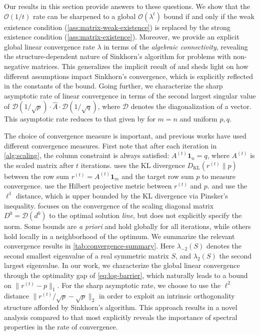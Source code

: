 Our results in this section provide answers to these questions. We show that the $\mathcal O(1/t)$ rate can be sharpened to a global $\mathcal O(\lambda^t)$ bound if and only if the weak existence condition (\cref{ass:matrix-weak-existence}) is replaced by the strong existence condition (\cref{ass:matrix-existence}). Moreover, we provide an explicit global linear convergence rate $\lambda$ in terms of the \emph{algebraic connectivity}, revealing the structure-dependent nature of Sinkhorn's algorithm for problems with non-negative matrices. This generalizes the implicit result of \citet{luo1992convergence} and sheds light on how different assumptions impact Sinkhorn's convergence, which is explicitly reflected in the constants of the bound. Going further, we characterize the sharp asymptotic rate of linear convergence in terms of the second largest singular value of $\mathcal{D}(1/\sqrt{p})\cdot\hat{A}\cdot\mathcal{D}(1/\sqrt{q})$, where $\mathcal{D}$ denotes the diagonalization of a vector. This asymptotic rate reduces to that given by \citet{knight2008sinkhorn} for $m=n$ and uniform $p,q$.

The choice of convergence measure is important, and previous works have used different convergence measures. First note that after each iteration in \cref{alg:scaling}, the column constraint is always satisfied: ${A}^{(t)}\mathbf{1}_n=q$, where ${A}^{(t)}$ is the scaled matrix after $t$ iterations. 
\citet{leger2021gradient} uses the KL divergence $D_{\text{KL}}(r^{(t)}\| p)$ between the row sum $r^{(t)}={A}^{(t)}\mathbf{1}_m$ and the target row sum $p$ to measure convergence. \citet{franklin1989scaling} use the Hilbert projective metric between $r^{(t)}$ and $p$. \citet{pukelsheim2009iterative} and \citet{altschuler2017near} use the $\ell^1$ distance, which is upper bounded by the KL divergence via Pinsker's inequality. \citet{knight2008sinkhorn} focuses on the convergence of the scaling diagonal matrix $D^0=\mathcal{D}(d^0)$ to the optimal solution \emph{line}, but does not explicitly specify the norm.
Some bounds are \emph{a priori} and hold globally for all iterations, while others hold locally in a neighborhood of the optimum.
We summarize the relevant convergence results in \cref{tab:convergence-summary}. Here $\lambda_{-2}(S)$ denotes the second smallest eigenvalue of a real symmetric matrix $S$, and $\lambda_{2}(S)$ the second largest eigenvalue. In our work, we characterize the global linear convergence through the optimality gap of \eqref{eq:log-barrier}, which naturally leads to a bound on $\|r^{(t)}-p\|_1$. For the sharp asymptotic rate, we choose to use the $\ell^2$ distance $\|r^{(t)}/\sqrt{p}-\sqrt{p}\|_2$ in order to exploit an intrinsic orthogonality structure afforded by Sinkhorn's algorithm. This approach results in a novel analysis compared to \citet{knight2008sinkhorn} that most explicitly reveals the importance of spectral properties in  the rate of convergence.

